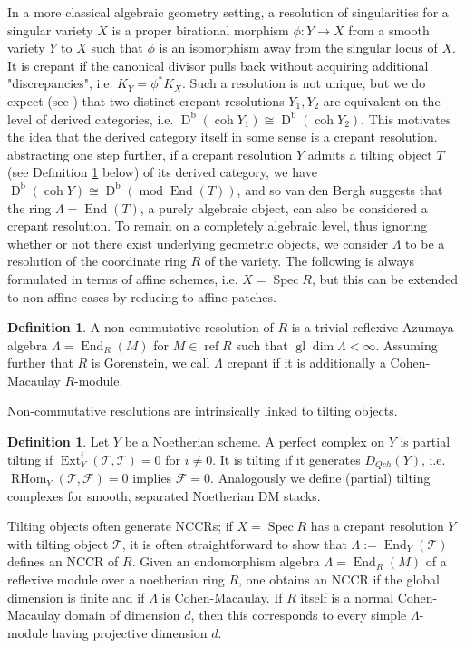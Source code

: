 \documentclass[reqno, 12pt]{amsart}
\theoremstyle{definition}
\newtheorem{definition}[theorem]{Definition}
\numberwithin{equation}{section}
\newcommand{\newterm}{\textsf}
\newcommand{\dbcoh}[1]{\operatorname{D}^{\operatorname{b}}(\operatorname{coh }#1)}
\newcommand{\dbmod}[1]{\operatorname{D}^{\operatorname{b}}(\operatorname{mod }#1)}
\newcommand{\End}{\operatorname{End}}
\newcommand{\spec}{\operatorname{Spec}}
\newcommand{\Rhom}{\operatorname{RHom}}
\newcommand{\Ext}{\operatorname{Ext}}
\newcommand{\gldim}{\operatorname{gl}\dim}
\begin{document}
In a more classical algebraic geometry setting, a resolution of singularities for a singular variety $X$ is a proper birational morphism $\phi:Y\rightarrow X$ from a smooth variety $Y$ to $X$ such that $\phi$ is an isomorphism away from the singular locus of $X$. It is crepant if the canonical divisor pulls back without acquiring additional "discrepancies", i.e. $K_Y=\phi^\ast K_X$. Such a resolution is not unique, but we do expect (see \cite{BO02,Kaw02}) that two distinct crepant resolutions $Y_1, Y_2$ are equivalent on the level of derived categories, i.e. $\dbcoh{ Y_1}\cong \dbcoh{Y_2}$. This motivates the idea that the derived category itself in some sense is a crepant resolution. abstracting one step further, if a crepant resolution $Y$ admits a tilting object $T$ (see Definition \ref{Def:tilt} below) of its derived category, we have $\dbcoh{Y}\cong \dbmod{\End(T)}$, and so van den Bergh suggests that the ring $\Lambda=\End(T)$, a purely algebraic object, can also be considered a crepant resolution. To remain on a completely algebraic level, thus ignoring whether or not there exist underlying geometric objects, we consider $\Lambda$ to be a resolution of the coordinate ring $R$ of the variety. The following is always formulated in terms of affine schemes, i.e. $X=\spec R$, but this can be extended to non-affine cases by reducing to affine patches.


\begin{definition}
    \label{Def:NCCR}
    A \newterm{non-commutative resolution} of $R$ is a trivial reflexive Azumaya algebra $\Lambda=\End_R(M)$ for $M\in \operatorname{ref}R$ such that $\gldim\Lambda<\infty$. Assuming further that $R$ is Gorenstein, we call $\Lambda$ \newterm{crepant} if it is additionally a Cohen-Macaulay $R$-module.
\end{definition}

\noindent Non-commutative resolutions are intrinsically linked to \newterm{tilting objects}. 

\begin{definition}
    \label{Def:tilt}
     Let $Y$ be a Noetherian scheme. A perfect complex on $Y$ is \newterm{partial tilting} if $\Ext^i_Y(\mathcal{T},\mathcal{T})=0$ for $i\neq 0$. It is \newterm{tilting} if it generates $D_{Qch}(Y)$, i.e. $\Rhom_Y(\mathcal{T},\mathcal{F})=0$ implies $\mathcal{F}=0$. Analogously we define (partial) tilting complexes for smooth, separated Noetherian DM stacks.
\end{definition}

Tilting objects often generate NCCRs; if $X=\spec R$ has a crepant resolution $Y$ with tilting object $\mathcal{T}$, it is often straightforward to show that $\Lambda:=\End_Y(\mathcal{T})$ defines an NCCR of $R$. Given an endomorphism algebra $\Lambda=\End_R(M)$ of a reflexive module over a noetherian ring $R$, one obtains an NCCR if the global dimension is finite and if $\Lambda$ is Cohen-Macaulay. If $R$ itself is a normal Cohen-Macaulay domain of dimension $d$, then this corresponds to every simple $\Lambda$-module having projective dimension $d$.
\end{document}
